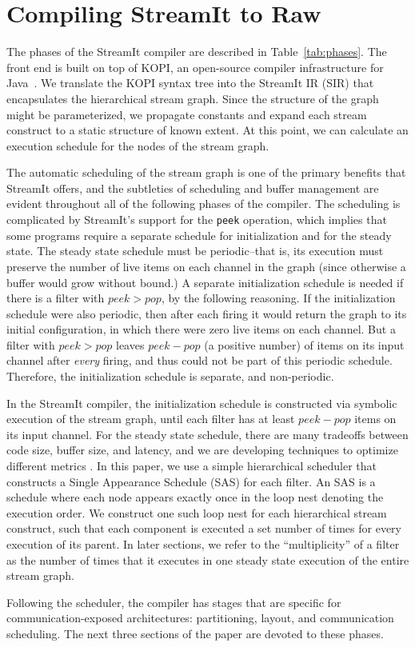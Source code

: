 \section{Compiling StreamIt to Raw}
\label{sec:phases}

The phases of the StreamIt compiler are described in
Table~\ref{tab:phases}.  The front end is built on top of KOPI, an
open-source compiler infrastructure for Java~\cite{kopi}.  We
translate the KOPI syntax tree into the StreamIt IR (SIR) that
encapsulates the hierarchical stream graph.  Since the structure of
the graph might be parameterized, we propagate constants and expand
each stream construct to a static structure of known extent.  At this
point, we can calculate an execution schedule for the nodes of the
stream graph.

The automatic scheduling of the stream graph is one of the primary
benefits that StreamIt offers, and the subtleties of scheduling and
buffer management are evident throughout all of the following phases
of the compiler.  The scheduling is complicated by StreamIt's support
for the {\tt peek} operation, which implies that some programs require
a separate schedule for initialization and for the steady state.  The
steady state schedule must be periodic--that is, its execution must
preserve the number of live items on each channel in the graph (since
otherwise a buffer would grow without bound.)  A separate
initialization schedule is needed if there is a filter with $peek >
pop$, by the following reasoning.  If the initialization schedule were
also periodic, then after each firing it would return the graph to its
initial configuration, in which there were zero live items on each
channel.  But a filter with $peek > pop$ leaves $peek-pop$ (a positive
number) of items on its input channel after {\it every} firing, and
thus could not be part of this periodic schedule.  Therefore, the
initialization schedule is separate, and non-periodic.

In the StreamIt compiler, the initialization schedule is constructed
via symbolic execution of the stream graph, until each filter has at
least $peek-pop$ items on its input channel.  For the steady state
schedule, there are many tradeoffs between code size, buffer size, and
latency, and we are developing techniques to optimize different
metrics \cite{streamittech2}.  In this paper, we use a simple
hierarchical scheduler that constructs a Single Appearance Schedule
(SAS) \cite{leesdf} for each filter.  An SAS is a schedule where each
node appears exactly once in the loop nest denoting the execution
order.  We construct one such loop nest for each hierarchical stream
construct, such that each component is executed a set number of times
for every execution of its parent.  In later sections, we refer to the
``multiplicity'' of a filter as the number of times that it executes
in one steady state execution of the entire stream graph.

Following the scheduler, the compiler has stages that are specific for
communication-exposed architectures: partitioning, layout, and
communication scheduling.  The next three sections of the paper are
devoted to these phases.



